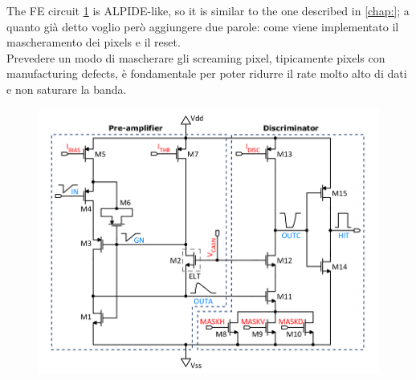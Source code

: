     The FE circuit \ref{fig:Monopix1_FE_circuit} is ALPIDE-like, so it is similar to the one described in \ref{chap:}; a quanto già detto voglio però aggiungere due parole: come viene implementato il mascheramento dei pixels e il reset.\\ 
    Prevedere un modo di mascherare gli screaming pixel, tipicamente pixels con manufacturing defects, è fondamentale per poter ridurre il rate molto alto di dati e non saturare la banda. 
    \begin{figure}[h!]
        \centering
        \includegraphics[width=.6\linewidth]{figures/Monopix1/Monopix1_FE_circuit.png}
        \caption{}
        \label{fig:Monopix1_FE_circuit}
    \end{figure}

